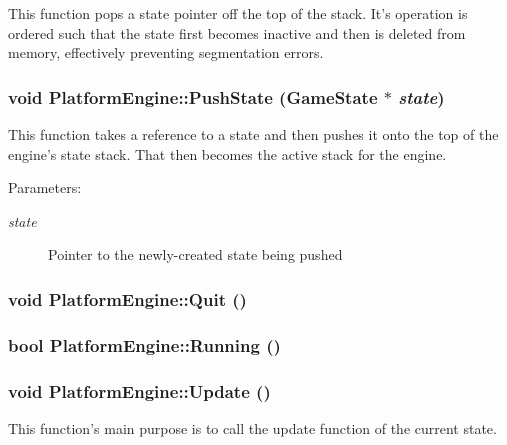 This function pops a state pointer off the top of the stack. It's operation is ordered such that the state first becomes inactive and then is deleted from memory, effectively preventing segmentation errors. \hypertarget{class_platform_engine_98e3d34b6ee831bcc1d26bac83bfe8d8}{
\subsubsection[{PushState}]{\setlength{\rightskip}{0pt plus 5cm}void PlatformEngine::PushState ({\bf GameState} $\ast$ {\em state})}}
\label{class_platform_engine_98e3d34b6ee831bcc1d26bac83bfe8d8}


This function takes a reference to a state and then pushes it onto the top of the engine's state stack. That then becomes the active stack for the engine.

\begin{Desc}
\item[Parameters:]
\begin{description}
\item[{\em state}]Pointer to the newly-created state being pushed \end{description}
\end{Desc}
\hypertarget{class_platform_engine_dbcdd91813cabbe51bb2f86eb23e772a}{
\subsubsection[{Quit}]{\setlength{\rightskip}{0pt plus 5cm}void PlatformEngine::Quit ()}}
\label{class_platform_engine_dbcdd91813cabbe51bb2f86eb23e772a}


\hypertarget{class_platform_engine_31ec37c0222f4694cc3c0e819e143038}{
\subsubsection[{Running}]{\setlength{\rightskip}{0pt plus 5cm}bool PlatformEngine::Running ()}}
\label{class_platform_engine_31ec37c0222f4694cc3c0e819e143038}


\hypertarget{class_platform_engine_d3ab75304226ad3fcac6b66ce3cedbc7}{
\subsubsection[{Update}]{\setlength{\rightskip}{0pt plus 5cm}void PlatformEngine::Update ()}}
\label{class_platform_engine_d3ab75304226ad3fcac6b66ce3cedbc7}


This function's main purpose is to call the update function of the current state. 